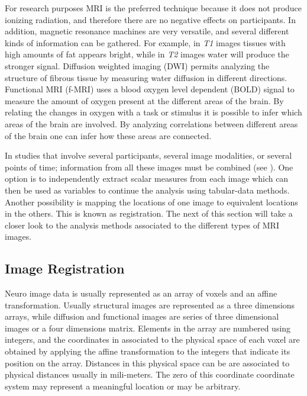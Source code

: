 For research purposes MRI is the preferred technique because it does not produce ionizing radiation, and therefore there are no negative effects on participants. In addition, magnetic resonance machines are very versatile, and several different kinds of information can be gathered. For example, in \emph{T1} images tissues with high amounts of fat appears bright, while in \emph{T2} images water will produce the stronger signal. Diffusion weighted imaging (DWI) permits analyzing the structure of fibrous tissue by measuring water diffusion in different directions. Functional MRI (f-MRI) uses a blood oxygen level dependent (BOLD) signal to measure the amount of oxygen present at the different areas of the brain. By relating the changes in oxygen with a task or stimulus it is possible to infer which areas of the brain are involved. By analyzing correlations between different areas of the brain one can infer how these areas are connected.

In studies that involve several participants, several image modalities, or several points of time; information from all these images must be combined (see \autocite{botha_individual_2012}). One option is to independently extract scalar measures from each image which can then be used as variables to continue the analysis using tabular-data methods. Another possibility is mapping the locations of one image to equivalent locations in the others. This is known as registration. The next of this section will take a closer look to the analysis methods associated to the different types of MRI images.
 

\subsection{Image Registration}

Neuro image data is usually represented as an array of voxels and an affine transformation. Usually structural images are represented as a three dimensions arrays, while diffusion and functional images are series of three dimensional images or a four dimensions matrix. Elements in the array are numbered using integers, and the coordinates in associated to the physical space of each voxel are obtained by applying the affine transformation to the integers that indicate its position on the array. Distances in this physical space can be are associated to physical distances usually in mili-meters. The zero of this coordinate coordinate system may represent a meaningful location or may be arbitrary. 


